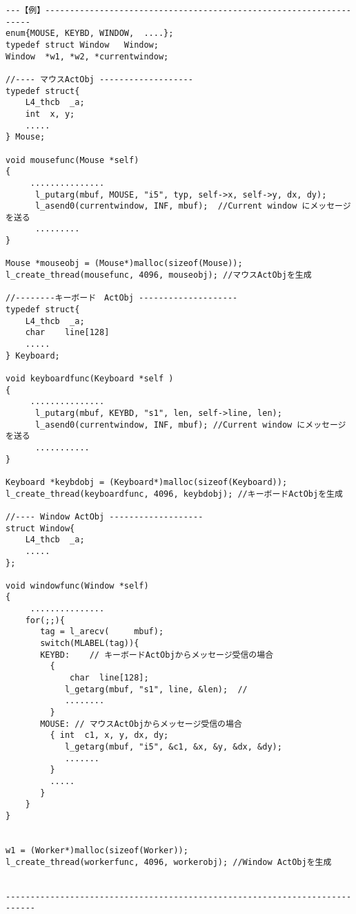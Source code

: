 \begin{verbatim}
---【例】-------------------------------------------------------------------
enum{MOUSE, KEYBD, WINDOW,  ....};
typedef struct Window   Window;
Window  *w1, *w2, *currentwindow;

//---- マウスActObj -------------------
typedef struct{
    L4_thcb  _a;
    int  x, y;
    .....
} Mouse;

void mousefunc(Mouse *self)
{
     ...............
      l_putarg(mbuf, MOUSE, "i5", typ, self->x, self->y, dx, dy);
      l_asend0(currentwindow, INF, mbuf);  //Current window にメッセージを送る
      .........
}

Mouse *mouseobj = (Mouse*)malloc(sizeof(Mouse));
l_create_thread(mousefunc, 4096, mouseobj); //マウスActObjを生成

//--------キーボード　ActObj --------------------
typedef struct{
    L4_thcb  _a;
    char    line[128]
    .....
} Keyboard;

void keyboardfunc(Keyboard *self )
{
     ...............
      l_putarg(mbuf, KEYBD, "s1", len, self->line, len);
      l_asend0(currentwindow, INF, mbuf); //Current window にメッセージを送る
      ...........
}

Keyboard *keybdobj = (Keyboard*)malloc(sizeof(Keyboard));
l_create_thread(keyboardfunc, 4096, keybdobj); //キーボードActObjを生成

//---- Window ActObj ------------------- 
struct Window{
    L4_thcb  _a;
    .....
};

void windowfunc(Window *self)
{
     ...............
    for(;;){
       tag = l_arecv(     mbuf);
       switch(MLABEL(tag)){
       KEYBD:    // キーボードActObjからメッセージ受信の場合
         {
             char  line[128]; 
            l_getarg(mbuf, "s1", line, &len);  //
            ........
         }
       MOUSE: // マウスActObjからメッセージ受信の場合
         { int  c1, x, y, dx, dy;
            l_getarg(mbuf, "i5", &c1, &x, &y, &dx, &dy);
            .......
         }
         .....
       }
    }
}


w1 = (Worker*)malloc(sizeof(Worker));
l_create_thread(workerfunc, 4096, workerobj); //Window ActObjを生成


----------------------------------------------------------------------------
\end{verbatim}



